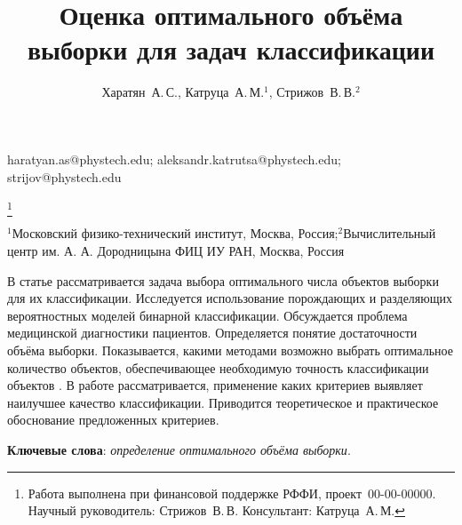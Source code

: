 \documentclass[12pt,twoside]{article}
\begin{document}
\title
    {Оценка оптимального объёма выборки для задач классификации}
\author
    {Харатян~А.\,С., Катруца~А.\,М.$^1$, Стрижов~В.\,В.$^2$} %
\email
	{haratyan.as@phystech.edu; aleksandr.katrutsa@phystech.edu; strijov@phystech.edu}

\thanks
    {Работа выполнена при финансовой поддержке РФФИ, проект \No\,00-00-00000.
     Научный руководитель:  Стрижов~В.\,В.
     Консультант:  Катруца~А.\,М.}

\organization
    {$^1$Московский физико-технический институт, Москва, Россия;$^2$Вычислительный центр им. А. А. Дородницына ФИЦ ИУ РАН, Москва, Россия}
    
\abstract
	{В статье рассматривается задача выбора оптимального числа объектов выборки для их классификации. Исследуется использование порождающих и разделяющих вероятностных моделей бинарной классификации. Обсуждается проблема медицинской диагностики пациентов\cite{journals/jcam/MotrenkoSW14}. Определяется понятие достаточности объёма выборки\cite{journals/technometrics/TsengTL07}. Показывается, какими методами возможно выбрать оптимальное количество объектов, обеспечивающее необходимую точность классификации объектов . В работе рассматривается, применение каких критериев выявляет наилучшее качество классификации\cite{journals/cssc/Martini08}. Приводится теоретическое и практическое обоснование предложенных критериев.

\bigskip
\noindent
\textbf{Ключевые слова}: \emph {определение оптимального объёма выборки}.

}



\maketitle




\end{document}
